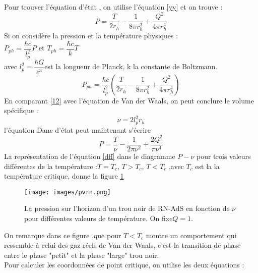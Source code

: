 \documentclass[12pt,  a4paper, openright]{report} %
\begin{document}
Pour trouver l’équation d’état , on utilise l’équation \ref{yy} et on trouve :
\begin{equation}
P=\dfrac{T}{2r_{h}}-\dfrac{1}{8\pi r_{h}^{2}}+\dfrac{Q^{2}}{4\pi r_{h}^{4}}
\end{equation}
Si on considère la pression et la température physiques  :\\
$P_{ph}=\dfrac{\hbar c}{l_{p}^{2}}P$ et $T_{ph}=\dfrac{\hbar c}{k}T$ \\
avec $l_{p}^{2}=\dfrac{\hbar G}{c^{3}}$est la longueur de Planck, k la constante de Boltzmann.
\begin{equation}
\label{12}
P_{ph}=\dfrac{\hbar c}{l_{p}^{2}}(\dfrac{T}{2r_{h}}-\dfrac{1}{8\pi r_{h}^{2}}+\dfrac{Q^{2}}{4\pi r_{h}^{4}})
\end{equation}
En comparant \ref{12} avec l’équation de Van der Waals, on peut conclure le volume spécifique
\cite{21} :
\begin{equation}
\nu=2l_{p}^{2}r_{h}
\end{equation}
l’équation
Danc d’état peut maintenant s’écrire
\begin{equation}
\label{dff}
P=\dfrac{T}{\nu}-\dfrac{1}{2\pi \nu^{2}}+\dfrac{2Q^{2}}{\pi \nu^{4}}
\end{equation}
La représentation de l'équation \ref{dff} dans le diagramme $P -\nu$ pour trois valeurs différentes
de la température :$ T = T_{c}$, $T > T_{c}$, $T < T_{c}$ ,avec $T_{c}$ est la la température critique, donne la figure \ref{pvrn}

\begin{figure}[H]
\begin{center}
	\texttt{[image: images/pvrn.png]}
	
	\caption{La pression sur l'horizon
		d’un trou noir de RN-AdS en fonction de
	$\nu$ pour différentes valeurs de température.
		On fixe$ Q = 1$.}
	\label{pvrn}
\end{center}
\end{figure}

On remarque dans ce figure ,que pour $ T < T_{c}$ montre un comportement qui ressemble à celui des
gaz réels de Van der Waals, c’est la transition de phase entre le phase "petit" et la phase
"large" trou noir.\\

Pour calculer les coordonnées de point critique, on utilise les deux équations :
\end{document}
